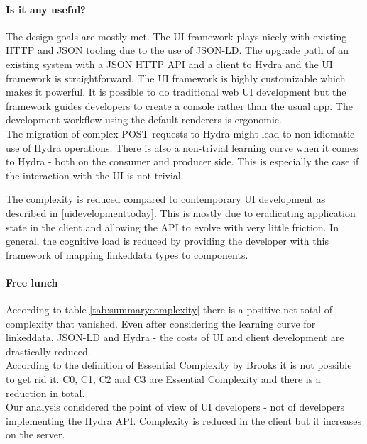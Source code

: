\paragraph{Is it any useful?}
The design goals are mostly met. The UI framework plays nicely with existing HTTP and JSON tooling due to the use of JSON-LD. The upgrade path of an existing system with a JSON HTTP API and a client to Hydra and the UI framework is straightforward. The UI framework is highly customizable which makes it powerful. It is possible to do traditional web UI development but the framework guides developers to create a console rather than the usual app. The development workflow using the default renderers is ergonomic. \\
The migration of complex POST requests to Hydra might lead to non-idiomatic use of Hydra operations. There is also a non-trivial learning curve when it comes to Hydra - both on the consumer and producer side. This is especially the case if the interaction with the UI is not trivial.

The complexity is reduced compared to contemporary UI development as described in \ref{uidevelopmenttoday}. This is mostly due to eradicating application state in the client and allowing the API to evolve with very little friction. In general, the cognitive load is reduced by providing the developer with this framework of mapping \gls{linkeddata} types to components.

\paragraph{Free lunch}
According to table \ref{tab:summarycomplexity} there is a positive net total of complexity that vanished. Even after considering the learning curve for \gls{linkeddata}, JSON-LD and Hydra - the costs of UI and client development are drastically reduced. \\
According to the definition of Essential Complexity by Brooks it is not possible to get rid it. C0, C1, C2 and C3 are Essential Complexity and there is a reduction in total. \\
Our analysis considered the point of view of UI developers - not of developers implementing the Hydra API. Complexity is reduced in the client but it increases on the server.

